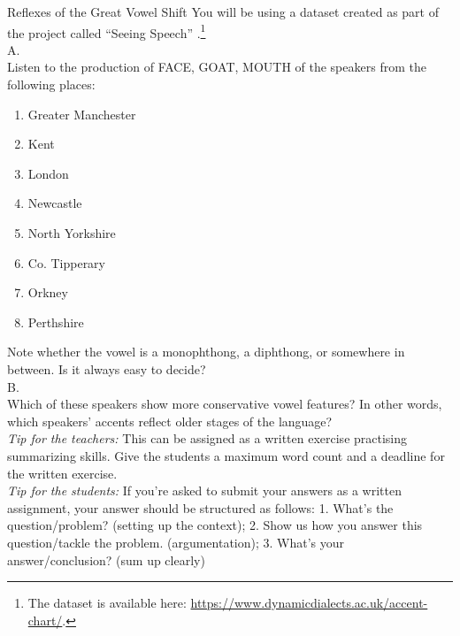 \begin{exercises}{Reflexes of the Great Vowel Shift}\label{EModE-GVS-exercise}\label{ex-GVS}
You will be using a dataset created as part of the project called ``Seeing Speech'' \citep{LawsonEtAl2015}.\footnote{The dataset is available here: \url{https://www.dynamicdialects.ac.uk/accent-chart/}.}\\

\noindent A.\\
Listen to the production of FACE, GOAT, MOUTH of the speakers from the following places:
 
\begin{enumerate}
    \item Greater Manchester 
    \item Kent 
    \item London 
    \item Newcastle 
    \item North Yorkshire 
    \item Co. Tipperary 
    \item Orkney 
    \item Perthshire
\end{enumerate}

\noindent Note whether the vowel is a monophthong, a diphthong, or somewhere in between. Is it always easy to decide?\\

\noindent B.\\
Which of these speakers show more conservative vowel features? In other words, which speakers' accents reflect older stages of the language?\\

\noindent\emph{Tip for the teachers:} This can be assigned as a written exercise practising summarizing skills. Give the students a maximum word count and a deadline for the written exercise.\\

\noindent\emph{Tip for the students:} If you're asked to submit your answers as a written assignment, your answer should be structured as follows: 1. What's the question/problem? (setting up the context); 2. Show us how you answer this question/tackle the problem. (argumentation); 3. What's your answer/conclusion? (sum up clearly)

\end{exercises}


